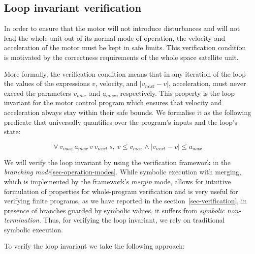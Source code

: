 \subsection{Loop invariant verification}

In order to ensure that the motor will not introduce disturbances
and will not lead the whole unit out of its normal mode of operation, the velocity and
acceleration of the motor must be kept in safe limits. This verification condition
is motivated by the correctness requirements of the whole space satellite unit.

More formally, the verification condition means
that in any iteration of the loop the values of the
expressions $v$, velocity, and $\left| v_{next} - v \right|$,
acceleration, must never exceed the parameters $v_{max}$ and $a_{max}$, respectively.
This property is the loop invariant for the motor control program which
ensures that velocity and acceleration always stay within their safe bounds. We
formalise it as the following predicate that universally quantifies over the
program's inputs and the loop's state:

\begin{tcolorbox}
\LARGE{
\[
  \forall\ v_{max}\ a_{max}\ v\ v_{next}\ s,
  \ v \leq v_{max} \land \left| v_{next} - v \right| \leq a_{max}
\]}
\end{tcolorbox}

\noindent
We will verify the loop invariant by using the verification framework in the
\emph{branching mode}\ref{sec-operation-modes}. While symbolic execution with
merging, which is implemented by the framework's \emph{mergin} mode, allows
for intuitive formulation of properties for whole-program verification and
is very useful for verifying finite programs, as we have
reported in the section~\ref{sec-verification}, in presence of branches guarded
by symbolic values, it suffers from \emph{symbolic non-termination}.
Thus, for verifying the loop invariant, we rely on traditional symbolic execution.

To verify the loop invariant we take the following approach:

